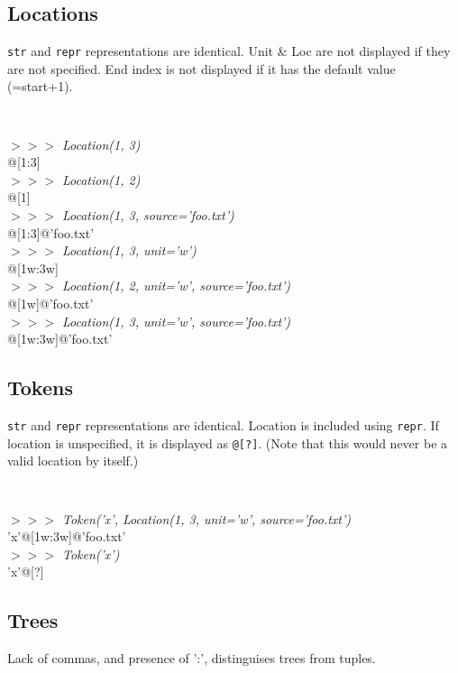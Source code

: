 \documentclass[11pt]{article}
\begin{document}
\subsection{Locations}

  \texttt{str} and \texttt{repr} representations are identical.  Unit
  \& Loc are not displayed if they are not specified.  End index is not
  displayed if it has the default value (=start+1).

{\tt
\begin{tabbing}
\emph{$>>>$ Location(1, 3)}\\
@[1:3]\\
\emph{$>>>$ Location(1, 2)}\\
@[1]\\
\emph{$>>>$ Location(1, 3, source='foo.txt')}\\
@[1:3]@'foo.txt'\\
\emph{$>>>$ Location(1, 3, unit='w')}\\
@[1w:3w]\\
\emph{$>>>$ Location(1, 2, unit='w', source='foo.txt')}\\
@[1w]@'foo.txt'\\
\emph{$>>>$ Location(1, 3, unit='w', source='foo.txt')}\\
@[1w:3w]@'foo.txt'
\end{tabbing}
}

\subsection{Tokens}

  \texttt{str} and \texttt{repr} representations are identical.
  Location is included using \texttt{repr}.  If location is
  unspecified, it is displayed as \texttt{@[?]}.  (Note that this
  would never be a valid location by itself.)

{\tt
\begin{tabbing}
\emph{$>>>$ Token('x', Location(1, 3, unit='w', source='foo.txt')}\\
'x'@[1w:3w]@'foo.txt'\\
\emph{$>>>$ Token('x')}\\
'x'@[?]
\end{tabbing}
}

\subsection{Trees}

  Lack of commas, and presence of ':', distinguises trees from tuples.
\end{document}
